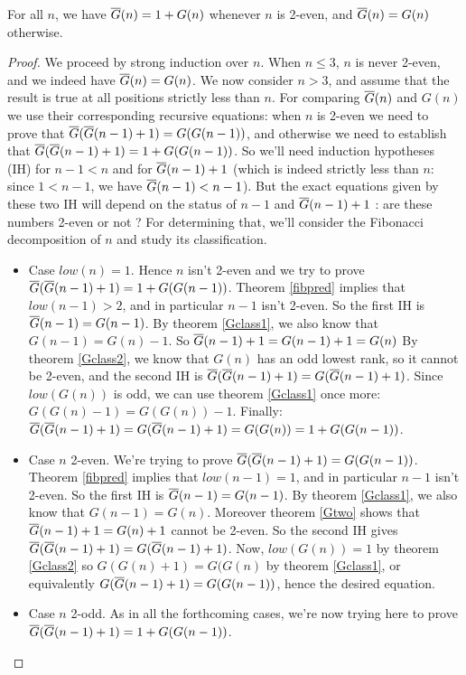 \documentclass[a4paper,11pt]{article}
\begin{document}
\begin{theorem}\label{comp-fg-g}
For all $n$, we have $\overline{G}(n)=1+G(n)$ whenever $n$ is 2-even,
and $\overline{G}(n)=G(n)$ otherwise.
\end{theorem}
\begin{proof}
We proceed by strong induction over $n$.
When $n\le 3$, $n$ is never 2-even, and we indeed have
$\overline{G}(n)=G(n)$. We now consider $n>3$, and assume that
the result is true at all positions strictly less than $n$.
For comparing $\overline{G}(n)$ and $G(n)$ we use their corresponding
recursive equations: when $n$ is 2-even we need to prove that
$\overline{G}(\overline{G}(n-1)+1)=G(G(n-1))$, and otherwise we need to establish
that $\overline{G}(\overline{G}(n-1)+1)=1+G(G(n-1))$. So we'll need
induction hypotheses (IH) for $n-1<n$ and for $\overline{G}(n-1)+1$
(which is indeed strictly less than $n$:
since $1<n-1$, we have $\overline{G}(n-1)<n-1$). But the exact equations
given by these two IH will depend on the
status of $n-1$ and $\overline{G}(n-1)+1$ : are these numbers 2-even or not ?
For determining that, we'll consider the Fibonacci decomposition
of $n$ and study its classification.
\begin{itemize}
\item Case $low(n)=1$. Hence $n$ isn't 2-even and we try to prove
  $\overline{G}(\overline{G}(n-1)+1)=1+G(G(n-1))$. Theorem \ref{fibpred} implies that
  $low(n-1)>2$, and in particular $n-1$ isn't 2-even.
  So the first IH is $\overline{G}(n-1)=G(n-1)$. By theorem
  \ref{Gclass1}, we also know that $G(n-1)=G(n)-1$.
  So $\overline{G}(n-1)+1=G(n-1)+1=G(n)$
  By theorem \ref{Gclass2}, we know that $G(n)$ has an odd lowest
  rank, so it cannot be 2-even, and the second IH is
  $\overline{G}(\overline{G}(n-1)+1)=G(\overline{G}(n-1)+1)$.
  Since $low(G(n))$ is odd, we can use theorem \ref{Gclass1} once
  more: $G(G(n)-1) = G(G(n))-1$.
  Finally: $\overline{G}(\overline{G}(n-1)+1)=G(\overline{G}(n-1)+1)=G(G(n))=1+G(G(n-1))$.
\item Case $n$ 2-even. We're trying to prove
  $\overline{G}(\overline{G}(n-1)+1)=G(G(n-1))$. Theorem \ref{fibpred} implies that
  $low(n-1) = 1$, and in particular $n-1$ isn't 2-even.
  So the first IH is $\overline{G}(n-1)=G(n-1)$.
  By theorem \ref{Gclass1}, we also know that $G(n-1)=G(n)$.
  Moreover theorem \ref{Gtwo} shows that $\overline{G}(n-1)+1 = G(n)+1$
  cannot be 2-even.
  So the second IH gives $\overline{G}(\overline{G}(n-1)+1) = G(\overline{G}(n-1)+1)$.
  Now, $low(G(n))=1$ by theorem \ref{Gclass2} so $G(G(n)+1)=G(G(n)$
  by theorem \ref{Gclass1}, or equivalently $G(\overline{G}(n-1)+1)=G(G(n-1))$,
  hence the desired equation.
\item Case $n$ 2-odd. As in all the forthcoming cases, we're now trying here
  to prove $\overline{G}(\overline{G}(n-1)+1)=1+G(G(n-1))$.

\end{itemize}
\end{proof}
\end{document}
